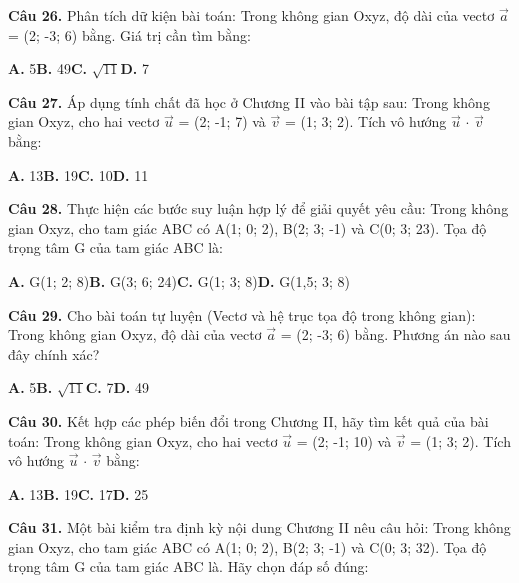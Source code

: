\documentclass[11pt,a4paper]{article}
\begin{document}
\textbf{\color{primary} Câu 26.} Phân tích dữ kiện bài toán: Trong không gian Oxyz, độ dài của vectơ $\vec{a}$ = (2; -3; 6) bằng. Giá trị cần tìm bằng:\par
\hspace*{1.5em}\textbf{A.} 5\quad\quad \textbf{B.} 49\quad\quad \textbf{C.} $\sqrt{11}$\quad\quad \textbf{D.} 7\par\vspace{2pt}
\textbf{\color{primary} Câu 27.} Áp dụng tính chất đã học ở Chương II vào bài tập sau: Trong không gian Oxyz, cho hai vectơ $\vec{u}$ = (2; -1; 7) và $\vec{v}$ = (1; 3; 2). Tích vô hướng $\vec{u}$ $\cdot$ $\vec{v}$ bằng:\par
\hspace*{1.5em}\textbf{A.} 13\quad\quad \textbf{B.} 19\quad\quad \textbf{C.} 10\quad\quad \textbf{D.} 11\par\vspace{2pt}
\textbf{\color{primary} Câu 28.} Thực hiện các bước suy luận hợp lý để giải quyết yêu cầu: Trong không gian Oxyz, cho tam giác ABC có A(1; 0; 2), B(2; 3; -1) và C(0; 3; 23). Tọa độ trọng tâm G của tam giác ABC là:\par
\hspace*{1.5em}\textbf{A.} G(1; 2; 8)\quad\quad \textbf{B.} G(3; 6; 24)\quad\quad \textbf{C.} G(1; 3; 8)\quad\quad \textbf{D.} G(1,5; 3; 8)\par\vspace{2pt}
\textbf{\color{primary} Câu 29.} Cho bài toán tự luyện (Vectơ và hệ trục tọa độ trong không gian): Trong không gian Oxyz, độ dài của vectơ $\vec{a}$ = (2; -3; 6) bằng. Phương án nào sau đây chính xác?\par
\hspace*{1.5em}\textbf{A.} 5\quad\quad \textbf{B.} $\sqrt{11}$\quad\quad \textbf{C.} 7\quad\quad \textbf{D.} 49\par\vspace{2pt}
\textbf{\color{primary} Câu 30.} Kết hợp các phép biến đổi trong Chương II, hãy tìm kết quả của bài toán: Trong không gian Oxyz, cho hai vectơ $\vec{u}$ = (2; -1; 10) và $\vec{v}$ = (1; 3; 2). Tích vô hướng $\vec{u}$ $\cdot$ $\vec{v}$ bằng:\par
\hspace*{1.5em}\textbf{A.} 13\quad\quad \textbf{B.} 19\quad\quad \textbf{C.} 17\quad\quad \textbf{D.} 25\par\vspace{2pt}
\textbf{\color{primary} Câu 31.} Một bài kiểm tra định kỳ nội dung Chương II nêu câu hỏi: Trong không gian Oxyz, cho tam giác ABC có A(1; 0; 2), B(2; 3; -1) và C(0; 3; 32). Tọa độ trọng tâm G của tam giác ABC là. Hãy chọn đáp số đúng:\par
\end{document}
